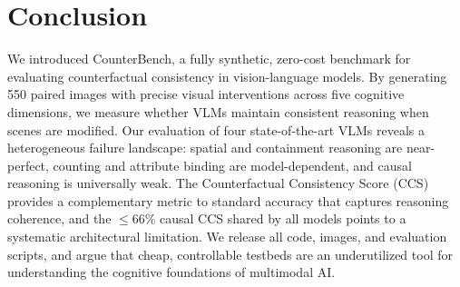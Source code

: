 \documentclass[10pt,twocolumn,letterpaper]{article}
\newcommand{\method}{CounterBench\xspace}
\newcommand{\ccs}{CCS\xspace}
\begin{document}
\section{Conclusion}
\label{sec:conclusion}

We introduced \method, a fully synthetic, zero-cost benchmark for evaluating counterfactual consistency in vision-language models. By generating 550 paired images with precise visual interventions across five cognitive dimensions, we measure whether VLMs maintain consistent reasoning when scenes are modified. Our evaluation of four state-of-the-art VLMs reveals a heterogeneous failure landscape: spatial and containment reasoning are near-perfect, counting and attribute binding are model-dependent, and causal reasoning is universally weak. The Counterfactual Consistency Score (\ccs) provides a complementary metric to standard accuracy that captures reasoning coherence, and the $\leq$66\% causal \ccs shared by all models points to a systematic architectural limitation. We release all code, images, and evaluation scripts, and argue that cheap, controllable testbeds are an underutilized tool for understanding the cognitive foundations of multimodal AI.

{
    \small
    
    
}
\end{document}
